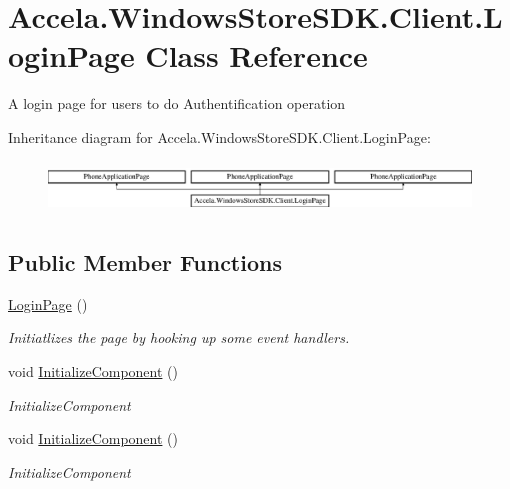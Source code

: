 \hypertarget{class_accela_1_1_windows_store_s_d_k_1_1_client_1_1_login_page}{\section{Accela.\+Windows\+Store\+S\+D\+K.\+Client.\+Login\+Page Class Reference}
\label{class_accela_1_1_windows_store_s_d_k_1_1_client_1_1_login_page}
}


A login page for users to do Authentification operation  


Inheritance diagram for Accela.\+Windows\+Store\+S\+D\+K.\+Client.\+Login\+Page\+:\begin{figure}[H]
\begin{center}
\leavevmode
\includegraphics[height=1.387856cm]{class_accela_1_1_windows_store_s_d_k_1_1_client_1_1_login_page}
\end{center}
\end{figure}
\subsection*{Public Member Functions}
\begin{DoxyCompactItemize}
\item 
\hyperlink{class_accela_1_1_windows_store_s_d_k_1_1_client_1_1_login_page_a9c58dbd13e48537c3acb037b4c20204a}{Login\+Page} ()
\begin{DoxyCompactList}\small\item\em Initiatlizes the page by hooking up some event handlers. \end{DoxyCompactList}\item 
void \hyperlink{class_accela_1_1_windows_store_s_d_k_1_1_client_1_1_login_page_a3d5a78699c57a42a54bd22579ae5348e}{Initialize\+Component} ()
\begin{DoxyCompactList}\small\item\em Initialize\+Component \end{DoxyCompactList}\item 
void \hyperlink{class_accela_1_1_windows_store_s_d_k_1_1_client_1_1_login_page_a3d5a78699c57a42a54bd22579ae5348e}{Initialize\+Component} ()
\begin{DoxyCompactList}\small\item\em Initialize\+Component \end{DoxyCompactList}\end{DoxyCompactItemize}
